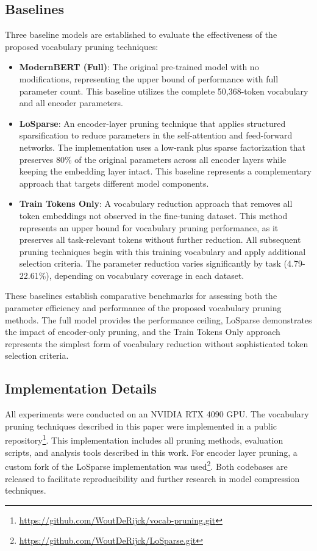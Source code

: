 \documentclass[twocolumn]{article}
\begin{document}




\subsection{Baselines}
Three baseline models are established to evaluate the effectiveness of the proposed vocabulary pruning techniques:

\begin{itemize}
    \item \textbf{ModernBERT (Full)}: The original pre-trained model with no modifications, representing the upper bound of performance with full parameter count. This baseline utilizes the complete 50,368-token vocabulary and all encoder parameters.
    \item \textbf{LoSparse}: An encoder-layer pruning technique that applies structured sparsification to reduce parameters in the self-attention and feed-forward networks. The implementation uses a low-rank plus sparse factorization that preserves 80\% of the original parameters across all encoder layers while keeping the embedding layer intact. This baseline represents a complementary approach that targets different model components.
    \item \textbf{Train Tokens Only}: A vocabulary reduction approach that removes all token embeddings not observed in the fine-tuning dataset. This method represents an upper bound for vocabulary pruning performance, as it preserves all task-relevant tokens without further reduction. All subsequent pruning techniques begin with this training vocabulary and apply additional selection criteria. The parameter reduction varies significantly by task (4.79-22.61\%), depending on vocabulary coverage in each dataset.
\end{itemize}
These baselines establish comparative benchmarks for assessing both the parameter efficiency and performance of the proposed vocabulary pruning methods. The full model provides the performance ceiling, LoSparse demonstrates the impact of encoder-only pruning, and the Train Tokens Only approach represents the simplest form of vocabulary reduction without sophisticated token selection criteria.

\subsection{Implementation Details}
All experiments were conducted on an NVIDIA RTX 4090 GPU. The vocabulary pruning techniques described in this paper were implemented in a public repository\footnote{\url{https://github.com/WoutDeRijck/vocab-pruning.git}}. This implementation includes all pruning methods, evaluation scripts, and analysis tools described in this work. For encoder layer pruning, a custom fork of the LoSparse implementation was used\footnote{\url{https://github.com/WoutDeRijck/LoSparse.git}}. Both codebases are released to facilitate reproducibility and further research in model compression techniques.
\end{document}
